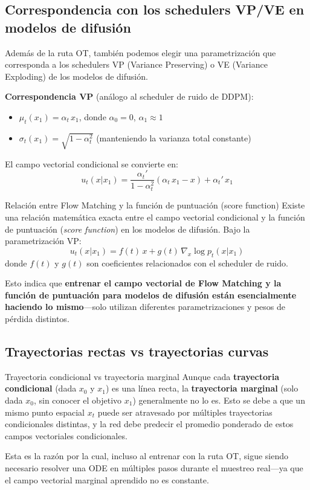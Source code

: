 \documentclass[a4paper]{article}
\begin{document}
\subsection{Correspondencia con los schedulers VP/VE en modelos de difusión}

Además de la ruta OT, también podemos elegir una parametrización que corresponda a los schedulers VP (Variance Preserving) o VE (Variance Exploding) de los modelos de difusión.

\textbf{Correspondencia VP} (análogo al scheduler de ruido de DDPM):
\begin{itemize}
    \item $\mu_t(x_1) = \alpha_t \, x_1$, donde $\alpha_0 = 0$, $\alpha_1 \approx 1$
    \item $\sigma_t(x_1) = \sqrt{1 - \alpha_t^2}$ (manteniendo la varianza total constante)
\end{itemize}

El campo vectorial condicional se convierte en:
$$u_t(x | x_1) = \frac{\alpha_t'}{1 - \alpha_t^2} \left( \alpha_t \, x_1 - x \right) + \alpha_t' \, x_1$$

\begin{knowledgebox}{Relación entre Flow Matching y la función de puntuación (score function)}
Existe una relación matemática exacta entre el campo vectorial condicional y la función de puntuación (\textit{score function}) en los modelos de difusión. Bajo la parametrización VP:
$$u_t(x | x_1) = f(t) \, x + g(t) \, \nabla_x \log p_t(x | x_1)$$
donde $f(t)$ y $g(t)$ son coeficientes relacionados con el scheduler de ruido.

Esto indica que \textbf{entrenar el campo vectorial de Flow Matching y la función de puntuación para modelos de difusión están esencialmente haciendo lo mismo}—solo utilizan diferentes parametrizaciones y pesos de pérdida distintos.
\end{knowledgebox}

\subsection{Trayectorias rectas vs trayectorias curvas}

\begin{warningbox}{Trayectoria condicional vs trayectoria marginal}
Aunque cada \textbf{trayectoria condicional} (dada $x_0$ y $x_1$) es una línea recta, la \textbf{trayectoria marginal} (solo dada $x_0$, sin conocer el objetivo $x_1$) generalmente no lo es. Esto se debe a que un mismo punto espacial $x_t$ puede ser atravesado por múltiples trayectorias condicionales distintas, y la red debe predecir el promedio ponderado de estos campos vectoriales condicionales.

Esta es la razón por la cual, incluso al entrenar con la ruta OT, sigue siendo necesario resolver una ODE en múltiples pasos durante el muestreo real—ya que el campo vectorial marginal aprendido no es constante.
\end{warningbox}
\end{document}
